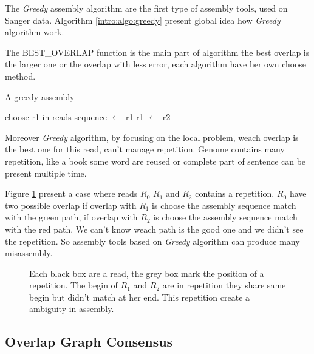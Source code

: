 \documentclass[main.tex]{subfiles}
\begin{document}
The \textit{Greedy} assembly algorithm are the first type of assembly tools, used on Sanger data. Algorithm \ref{intro:algo:greedy} present global idea how \textit{Greedy} algorithm work.

The BEST\_OVERLAP function is the main part of algorithm the best overlap is the larger one or the overlap with less error, each algorithm have her own choose method.

\begin{algorithm}
    \caption{A greedy assembly}
    \begin{algorithmic}[1]
        \State choose r1 in reads
        \State sequence $\leftarrow$ r1
            \State {}
            \State {}
            \State r1 $\leftarrow$ r2
        \EndWhile
    \EndFunction
    \end{algorithmic}
    \label{intro:algo:greedy}
\end{algorithm}

Moreover \textit{Greedy} algorithm, by focusing on the local problem, weach overlap is the best one for this read, can't manage repetition. Genome contains many repetition, like a book some word are reused or complete part of sentence can be present multiple time.

Figure \ref{intro:fig:greedy:repetition} present a case where reads $R_0$ $R_1$ and $R_2$ contains a repetition. $R_0$ have two possible overlap if overlap with $R_1$ is choose the assembly sequence match with the green path, if overlap with $R_2$ is choose the assembly sequence match with the red path. We can't know weach path is the good one and we didn't see the repetition. So assembly tools based on \textit{Greedy} algorithm can produce many misassembly.

\begin{figure}
    \centering 
    
    \caption{Each black box are a read, the grey box mark the position of a repetition. The begin of $R_1$ and $R_2$ are in repetition they share same begin but didn't match at her end. This repetition create a ambiguity in assembly.}
    \label{intro:fig:greedy:repetition}
\end{figure}

\subsection{Overlap Graph Consensus}
\end{document}

